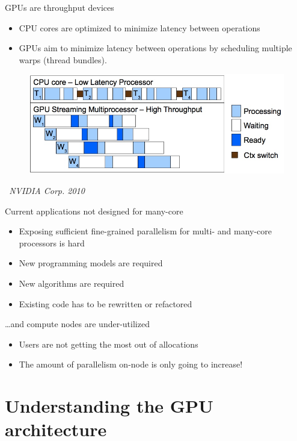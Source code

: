 \documentclass[aspectratio=169,12pt]{beamer}
\begin{document}
\begin{frame}{GPUs are throughput devices}
  \begin{itemize}
  \item CPU cores are optimized to minimize latency between operations
  \item GPUs aim to minimize latency between operations by scheduling multiple warps (thread bundles).
  \end{itemize}
  \begin{figure}
    \centering
    \includegraphics[width=.7\textwidth]{latency.jpg}
  \end{figure}
  \begin{flushright}
    \vspace{-\baselineskip}
    \raggedleft
    \scriptsize
    \emph{\textcopyright\ NVIDIA Corp. 2010}
  \end{flushright}
\end{frame}

\begin{frame}{Current applications not designed for many-core}
  \begin{itemize}
  \item Exposing sufficient fine-grained parallelism for multi- and many-core processors is hard
  \item New programming models are required
  \item New algorithms are required
  \item Existing code has to be rewritten or refactored
  \end{itemize}
  \pause
  \dots and compute nodes are under-utilized
  \begin{itemize}
  \item Users are not getting the most out of allocations
  \item The amount of parallelism on-node is only going to increase!
  \end{itemize}
\end{frame}


\part{Understanding the GPU architecture}
\end{document}
